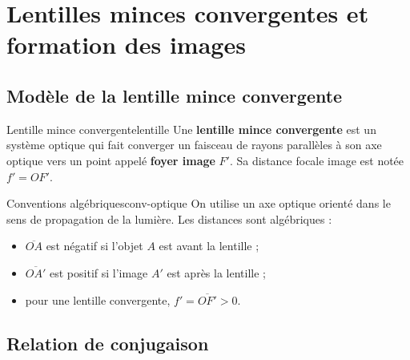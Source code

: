 \documentclass[11pt,a4paper]{article}
\begin{document}
\section{Lentilles minces convergentes et formation des images}

\subsection{Modèle de la lentille mince convergente}

\begin{definitionbox}{Lentille mince convergente}{lentille}
Une \textbf{lentille mince convergente} est un système optique qui fait converger un faisceau de rayons parallèles à son axe optique vers un point appelé \textbf{foyer image} $F'$. Sa distance focale image est notée $f'=OF'$.
\end{definitionbox}

\begin{retenirbox}{Conventions algébriques}{conv-optique}
On utilise un axe optique orienté dans le sens de propagation de la lumière. Les distances sont algébriques :
\begin{itemize}
  \item $\overline{OA}$ est négatif si l'objet $A$ est avant la lentille ;
  \item $\overline{OA'}$ est positif si l'image $A'$ est après la lentille ;
  \item pour une lentille convergente, $f'=\overline{OF'}>0$.
\end{itemize}
\end{retenirbox}

\begin{center}
\end{center}

\subsection{Relation de conjugaison}
\end{document}
